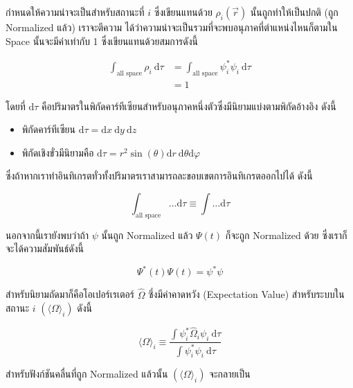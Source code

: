 กำหนดให้ความน่าจะเป็นสำหรับสถานะที่ $i$ ซึ่งเขียนแทนด้วย $\rho_i(\vec{r})$ นั้นถูกทำให้เป็นปกติ (ถูก Normalized แล้ว) เราจะตีความ%
ได้ว่าความน่าจะเป็นรวมที่จะพบอนุภาคที่ตำแหน่งไหนก็ตามใน Space นั้นจะมีค่าเท่ากับ 1 ซึ่งเขียนแทนด้วยสมการดังนี้

\begin{equation}
    \begin{aligned}
        \int_{\text{all space}} \rho_i \mathrm{~d} \tau 
        & = \int_{\text{all space}} \psi_i^* \psi_i \mathrm{~d} \tau \\
        & = 1
    \end{aligned}
\end{equation}

\noindent โดยที่ $\mathrm{d} \tau$ คือปริมาตรในพิกัดคาร์ทีเซียนสำหรับอนุภาคหนึ่งตัวซึ่งมีนิยามแบ่งตามพิกัดอ้างอิง ดังนี้

\begin{itemize}
    \item พิกัดคาร์ทีเซียน $\mathrm{d} \tau = \mathrm{d} x \mathrm{~d} y \mathrm{~d} z$ 
    
    \item พิกัดเชิงขั่วมีนิยามคือ $\mathrm{d} \tau = r^2 \sin (\theta) \mathrm{d} r \mathrm{~d} \theta \mathrm{d} \varphi$
\end{itemize}

\noindent ซึ่งถ้าหากเราทำอินทิเกรตทั่วทั้งปริมาตรเราสามารถละขอบเขตการอินทิเกรตออกไปได้ ดังนี้

\begin{equation}
    \int_{\text{all space}} \ldots \mathrm{d} \tau \equiv \int \ldots \mathrm{d} \tau
\end{equation}

นอกจากนี้เรายังพบว่าถ้า $\psi$ นั้นถูก Normalized แล้ว $\Psi(t)$ ก็จะถูก Normalized ด้วย ซึ่งเราก็จะได้ความสัมพันธ์ดังนี้ 

\begin{equation}
    \Psi^*(t) \Psi(t) = \psi^* \psi
\end{equation}

สำหรับนิยามถัดมาก็คือโอเปอร์เรเตอร์ $\hat{\Omega}$ ซึ่งมีค่าคาดหวัง (Expectation Value) สำหรับระบบในสถานะ $i$ 
$(\langle\Omega\rangle_i)$ ดังนี้

\begin{equation}
    \langle\Omega\rangle_i 
    \equiv 
    \frac{\int \psi_i^* \hat{\Omega}_i \psi_i \mathrm{~d} \tau}{\int \psi_i^* \psi_i \mathrm{~d} \tau}
\end{equation}

\noindent สำหรับฟังก์ชันคลื่นที่ถูก Normalized แล้วนั้น $(\langle\Omega\rangle_i)$ จะกลายเป็น

